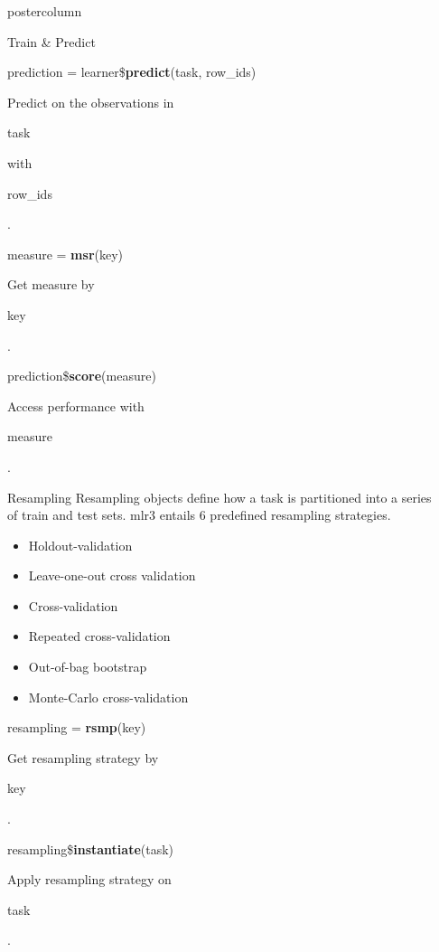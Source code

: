 \documentclass{beamer}
\newcommand{\codeinline}[1]{\begin{codeboxinline}#1\end{codeboxinline}}
\begin{document}
\begin{frame}[fragile]{}
\begin{columns}
\begin{column}{.245\textwidth}
\begin{beamercolorbox}[center]{postercolumn}
\begin{minipage}{.98\textwidth}
{\begin{myblock}{Train \& Predict}
							\\
							\begin{codebox}
								prediction = learner\$\textbf{predict}(task, row\_ids)
							\end{codebox}
							Predict on the observations in \codeinline{task} with \codeinline{row\_ids}.
							\\
							\begin{codebox}
								measure = \textbf{msr}(key)
							\end{codebox}
							Get measure by \codeinline{key}.
							\\
							\begin{codebox}
								prediction\$\textbf{score}(measure)
							\end{codebox}
							Access performance with \codeinline{measure}.
						\end{myblock}
						\begin{myblock}{Resampling}	
						Resampling objects define how a task is partitioned into a series of train and test sets. mlr3 entails 6 predefined resampling strategies.
						\\
						\begin{itemize}
							\item Holdout-validation
							\item Leave-one-out cross validation
							\item Cross-validation
							\item Repeated cross-validation
							\item Out-of-bag bootstrap
							\item Monte-Carlo cross-validation
						\end{itemize}
						\vspace{1cm}
						\begin{codebox}
							resampling = \textbf{rsmp}(key)
						\end{codebox}
						Get resampling strategy by \codeinline{key}.
						\\
						\begin{codebox}
							resampling\$\textbf{instantiate}(task)
						\end{codebox}
						Apply resampling strategy on \codeinline{task}.
					\end{myblock}
					}
				\end{minipage}
			\end{beamercolorbox}
		\end{column}
		\begin{column}{.245\textwidth}

\end{column}
\end{columns}
\end{frame}
\end{document}
